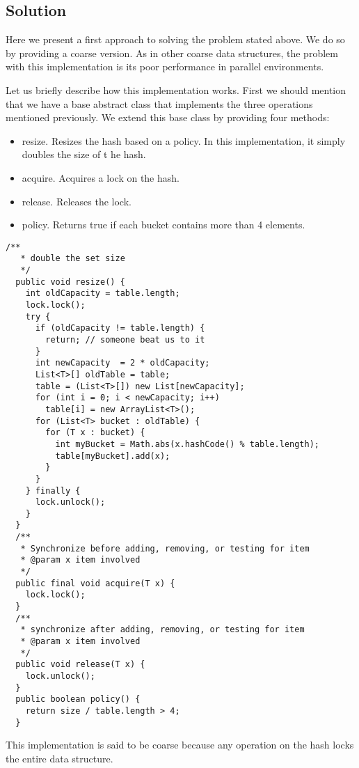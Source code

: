 \subsection{Solution}
\par
Here we present a first approach to solving the problem stated above. We do so
by providing a coarse version. As in other coarse data structures, the problem
with this implementation is its poor performance in parallel environments.
\par
Let us briefly describe how this implementation works. First we should mention
that we have a base abstract class that implements the three operations
mentioned previously. We extend this base class by providing four methods:
\par
\begin{itemize}
\item resize. Resizes the hash based on a policy. In this implementation, it
simply doubles the size of t he hash.
\item acquire. Acquires a lock on the hash.
\item release. Releases the lock.
\item policy. Returns true if each bucket contains more than 4 elements.
\end{itemize}
\par
\hfill
\begin{lstlisting}[style=numbers]
  /**
   * double the set size
   */
  public void resize() {
    int oldCapacity = table.length;
    lock.lock();
    try {
      if (oldCapacity != table.length) {
        return; // someone beat us to it
      }
      int newCapacity  = 2 * oldCapacity;
      List<T>[] oldTable = table;
      table = (List<T>[]) new List[newCapacity];
      for (int i = 0; i < newCapacity; i++)
        table[i] = new ArrayList<T>();
      for (List<T> bucket : oldTable) {
        for (T x : bucket) {
          int myBucket = Math.abs(x.hashCode() % table.length);
          table[myBucket].add(x);
        }
      }
    } finally {
      lock.unlock();
    }
  }
  /**
   * Synchronize before adding, removing, or testing for item
   * @param x item involved
   */
  public final void acquire(T x) {
    lock.lock();
  }
  /**
   * synchronize after adding, removing, or testing for item
   * @param x item involved
   */
  public void release(T x) {
    lock.unlock();
  }
  public boolean policy() {
    return size / table.length > 4;
  }
\end{lstlisting}
\hfill
\par
This implementation is said to be coarse because any operation on the hash locks the entire data structure. 
\par
